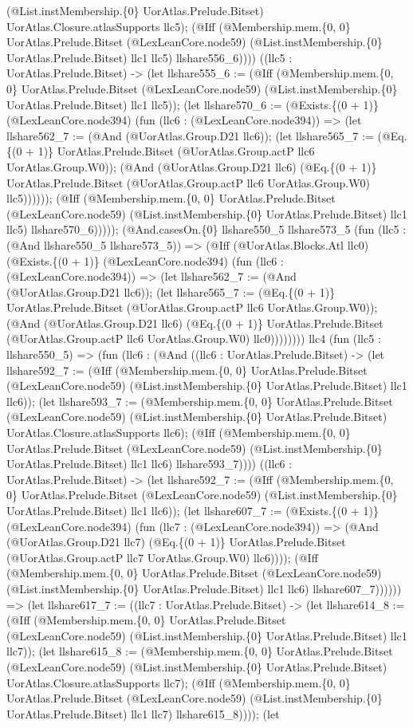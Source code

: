 \documentclass[11pt]{article}
\begin{document}
(@List.instMembership.\{0\} UorAtlas.Prelude.Bitset) UorAtlas.Closure.atlasSupports llc5); (@Iff (@Membership.mem.\{0, 0\} UorAtlas.Prelude.Bitset (@LexLeanCore.node59) (@List.instMembership.\{0\} UorAtlas.Prelude.Bitset) llc1 llc5) llshare556\_6)))) ((llc5 : UorAtlas.Prelude.Bitset) -> (let llshare555\_6 := (@Iff (@Membership.mem.\{0, 0\} UorAtlas.Prelude.Bitset (@LexLeanCore.node59) (@List.instMembership.\{0\} UorAtlas.Prelude.Bitset) llc1 llc5)); (let llshare570\_6 := (@Exists.\{(0 + 1)\} (@LexLeanCore.node394) (fun (llc6 : (@LexLeanCore.node394)) => (let llshare562\_7 := (@And (@UorAtlas.Group.D21 llc6)); (let llshare565\_7 := (@Eq.\{(0 + 1)\} UorAtlas.Prelude.Bitset (@UorAtlas.Group.actP llc6 UorAtlas.Group.W0)); (@And (@UorAtlas.Group.D21 llc6) (@Eq.\{(0 + 1)\} UorAtlas.Prelude.Bitset (@UorAtlas.Group.actP llc6 UorAtlas.Group.W0) llc5)))))); (@Iff (@Membership.mem.\{0, 0\} UorAtlas.Prelude.Bitset (@LexLeanCore.node59) (@List.instMembership.\{0\} UorAtlas.Prelude.Bitset) llc1 llc5) llshare570\_6))))); (@And.casesOn.\{0\} llshare550\_5 llshare573\_5 (fun (llc5 : (@And llshare550\_5 llshare573\_5)) => (@Iff (@UorAtlas.Blocks.Atl llc0) (@Exists.\{(0 + 1)\} (@LexLeanCore.node394) (fun (llc6 : (@LexLeanCore.node394)) => (let llshare562\_7 := (@And (@UorAtlas.Group.D21 llc6)); (let llshare565\_7 := (@Eq.\{(0 + 1)\} UorAtlas.Prelude.Bitset (@UorAtlas.Group.actP llc6 UorAtlas.Group.W0)); (@And (@UorAtlas.Group.D21 llc6) (@Eq.\{(0 + 1)\} UorAtlas.Prelude.Bitset (@UorAtlas.Group.actP llc6 UorAtlas.Group.W0) llc0)))))))) llc4 (fun (llc5 : llshare550\_5) => (fun (llc6 : (@And ((llc6 : UorAtlas.Prelude.Bitset) -> (let llshare592\_7 := (@Iff (@Membership.mem.\{0, 0\} UorAtlas.Prelude.Bitset (@LexLeanCore.node59) (@List.instMembership.\{0\} UorAtlas.Prelude.Bitset) llc1 llc6)); (let llshare593\_7 := (@Membership.mem.\{0, 0\} UorAtlas.Prelude.Bitset (@LexLeanCore.node59) (@List.instMembership.\{0\} UorAtlas.Prelude.Bitset) UorAtlas.Closure.atlasSupports llc6); (@Iff (@Membership.mem.\{0, 0\} UorAtlas.Prelude.Bitset (@LexLeanCore.node59) (@List.instMembership.\{0\} UorAtlas.Prelude.Bitset) llc1 llc6) llshare593\_7)))) ((llc6 : UorAtlas.Prelude.Bitset) -> (let llshare592\_7 := (@Iff (@Membership.mem.\{0, 0\} UorAtlas.Prelude.Bitset (@LexLeanCore.node59) (@List.instMembership.\{0\} UorAtlas.Prelude.Bitset) llc1 llc6)); (let llshare607\_7 := (@Exists.\{(0 + 1)\} (@LexLeanCore.node394) (fun (llc7 : (@LexLeanCore.node394)) => (@And (@UorAtlas.Group.D21 llc7) (@Eq.\{(0 + 1)\} UorAtlas.Prelude.Bitset (@UorAtlas.Group.actP llc7 UorAtlas.Group.W0) llc6)))); (@Iff (@Membership.mem.\{0, 0\} UorAtlas.Prelude.Bitset (@LexLeanCore.node59) (@List.instMembership.\{0\} UorAtlas.Prelude.Bitset) llc1 llc6) llshare607\_7)))))) => (let llshare617\_7 := ((llc7 : UorAtlas.Prelude.Bitset) -> (let llshare614\_8 := (@Iff (@Membership.mem.\{0, 0\} UorAtlas.Prelude.Bitset (@LexLeanCore.node59) (@List.instMembership.\{0\} UorAtlas.Prelude.Bitset) llc1 llc7)); (let llshare615\_8 := (@Membership.mem.\{0, 0\} UorAtlas.Prelude.Bitset (@LexLeanCore.node59) (@List.instMembership.\{0\} UorAtlas.Prelude.Bitset) UorAtlas.Closure.atlasSupports llc7); (@Iff (@Membership.mem.\{0, 0\} UorAtlas.Prelude.Bitset (@LexLeanCore.node59) (@List.instMembership.\{0\} UorAtlas.Prelude.Bitset) llc1 llc7) llshare615\_8)))); (let 
\end{document}
